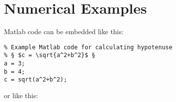 \section{Numerical Examples}
Matlab code can be embedded like this:
\begin{lstlisting}
% Example Matlab code for calculating hypotenuse
% § $c = \sqrt{a^2+b^2}$ §
a = 3;
b = 4;
c = sqrt(a^2+b^2);
\end{lstlisting}
or like this:
